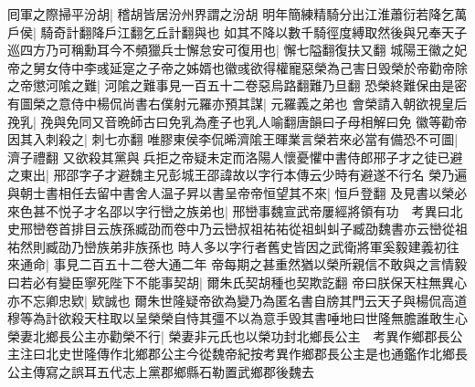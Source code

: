 囘軍之際掃平汾胡|{
	稽胡皆居汾州界謂之汾胡}
明年簡練精騎分出江淮蕭衍若降乞萬戶侯|{
	騎奇計翻降戶江翻乞丘計翻與也}
如其不降以數千騎徑度縛取然後與兄奉天子巡四方乃可稱勳耳今不頻獵兵士懈怠安可復用也|{
	懈七隘翻復扶又翻}
城陽王徽之妃帝之舅女侍中李彧延寔之子帝之姊婿也徽彧欲得權寵惡榮為己害日毁榮於帝勸帝除之帝懲河隂之難|{
	河隂之難事見一百五十二卷惡烏路翻難乃旦翻}
恐榮終難保由是密有圖榮之意侍中楊侃尚書右僕射元羅亦預其謀|{
	元羅義之弟也}
會榮請入朝欲視皇后㝃乳|{
	㝃與免同又音晩師古曰免乳為產子也乳人喻翻唐韻曰子母相解曰免}
徽等勸帝因其入刺殺之|{
	刺七亦翻}
唯膠東侯李侃晞濟隂王暉業言榮若來必當有備恐不可圖|{
	濟子禮翻}
又欲殺其黨與兵拒之帝疑未定而洛陽人懷憂懼中書侍郎郉子才之徒已避之東出|{
	郉邵字子才避魏主兄彭城王邵諱故以字行本傳云少時有避遂不行名}
榮乃遍與朝士書相任去留中書舍人温子昇以書呈帝帝恒望其不來|{
	恒戶登翻}
及見書以榮必來色甚不悦子才名邵以字行巒之族弟也|{
	邢巒事魏宣武帝屢經將領有功　考異曰北史邢巒卷首排目云族孫臧劭而卷中乃云巒叔祖祐祐從祖虯虯子臧劭魏書亦云巒從祖祐然則臧劭乃巒族弟非族孫也}
時人多以字行者舊史皆因之武衛將軍奚毅建義初往來通命|{
	事見二百五十二卷大通二年}
帝每期之甚重然猶以榮所親信不敢與之言情毅曰若必有變臣寧死陛下不能事契胡|{
	爾朱氏契胡種也契欺訖翻}
帝曰朕保天柱無異心亦不忘卿忠欵|{
	欵誠也}
爾朱世隆疑帝欲為變乃為匿名書自牓其門云天子與楊侃高道穆等為計欲殺天柱取以呈榮榮自恃其彊不以為意手毁其書唾地曰世隆無膽誰敢生心榮妻北鄉長公主亦勸榮不行|{
	榮妻非元氏也以榮功封北鄉長公主　考異作鄉郡長公主注曰北史世隆傳作北鄉郡公主今從魏帝紀按考異作鄉郡長公主是也通鑑作北鄉長公主傳寫之誤耳五代志上黨郡鄉縣石勒置武鄉郡後魏去}


